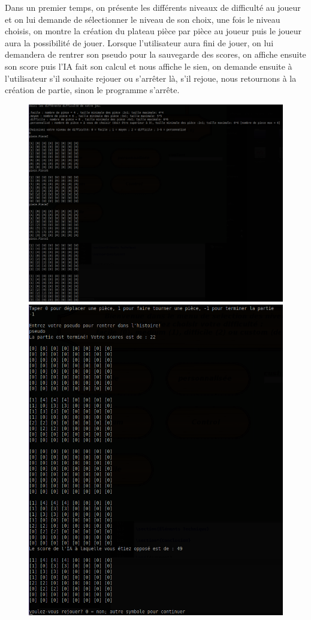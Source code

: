 \documentclass[12pt]{article}
\begin{document}
Dans un premier temps, on présente les différents niveaux de difficulté au joueur et on lui demande de sélectionner le niveau de son choix, une fois le niveau choisis, on montre la création du plateau pièce par pièce au joueur puis le joueur aura la possibilité de jouer. Lorsque l'utilisateur aura fini de jouer, on lui demandera de rentrer son pseudo pour la sauvegarde des scores, on affiche ensuite son score puis l'IA fait son calcul et nous affiche le sien, on demande ensuite à l'utilisateur s'il souhaite rejouer ou s'arrêter là, s'il rejoue, nous retournons à la création de partie, sinon le programme s'arrête.
\begin{figure}[h]
\begin{center}
\includegraphics[scale=0.15]{Images/creationPartieCons.png}
\includegraphics[scale=0.16]{Images/finPartieCons.png}

\end{center}
\end{figure}
\end{document}
